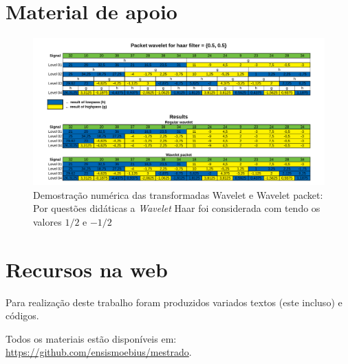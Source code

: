 \begin{apendicesenv}
	\partapendices
	\chapter{Material de apoio}
		\begin{landscape}
			\begin{figure}[h]
				\includegraphics[width=1\linewidth]{images/haarWaveletExamples.pdf}
				\caption{Demostração numérica das transformadas Wavelet e Wavelet packet: Por questões didáticas a \textit{Wavelet} Haar foi considerada com tendo os valores $1/2$ e $-1/2$}
				\label{fig:haarWaveletExamples}
			\end{figure}
		\end{landscape}
	\chapter{Recursos na web}
		\par Para realização deste trabalho foram produzidos variados textos (este incluso) e códigos. 
		\par Todos os materiais estão disponíveis em:  \href{https://github.com/ensismoebius/mestrado}{https://github.com/ensismoebius/mestrado}.
\end{apendicesenv}